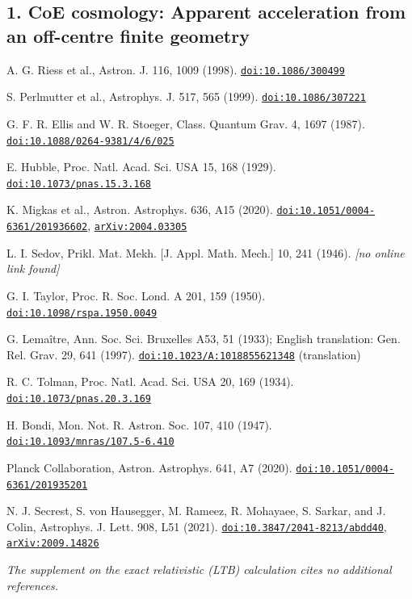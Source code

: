 \documentclass[11pt,a4paper]{article}
\begin{document}
\subsection*{1. CoE cosmology: Apparent acceleration from an off-centre finite geometry}
\begin{description}[leftmargin=2.6em,labelwidth=2.2em,labelsep=0.4em,itemsep=1pt,parsep=0pt,font=\normalfont]
\item[{[1]}] A. G. Riess et al., Astron. J. 116, 1009 (1998). \href{https://doi.org/10.1086/300499}{\nolinkurl{doi:10.1086/300499}}
\item[{[2]}] S. Perlmutter et al., Astrophys. J. 517, 565 (1999). \href{https://doi.org/10.1086/307221}{\nolinkurl{doi:10.1086/307221}}
\item[{[3]}] G. F. R. Ellis and W. R. Stoeger, Class. Quantum Grav. 4, 1697 (1987). \href{https://doi.org/10.1088/0264-9381/4/6/025}{\nolinkurl{doi:10.1088/0264-9381/4/6/025}}
\item[{[4]}] E. Hubble, Proc. Natl. Acad. Sci. USA 15, 168 (1929). \href{https://doi.org/10.1073/pnas.15.3.168}{\nolinkurl{doi:10.1073/pnas.15.3.168}}
\item[{[5]}] K. Migkas et al., Astron. Astrophys. 636, A15 (2020). \href{https://doi.org/10.1051/0004-6361/201936602}{\nolinkurl{doi:10.1051/0004-6361/201936602}}, \href{https://arxiv.org/abs/2004.03305}{\nolinkurl{arXiv:2004.03305}}
\item[{[6]}] L. I. Sedov, Prikl. Mat. Mekh. [J. Appl. Math. Mech.] 10, 241 (1946). \textit{[no online link found]}
\item[{[7]}] G. I. Taylor, Proc. R. Soc. Lond. A 201, 159 (1950). \href{https://doi.org/10.1098/rspa.1950.0049}{\nolinkurl{doi:10.1098/rspa.1950.0049}}
\item[{[8]}] G. Lemaître, Ann. Soc. Sci. Bruxelles A53, 51 (1933); English translation: Gen. Rel. Grav. 29, 641 (1997). \href{https://doi.org/10.1023/A:1018855621348}{\nolinkurl{doi:10.1023/A:1018855621348}} (translation)
\item[{[9]}] R. C. Tolman, Proc. Natl. Acad. Sci. USA 20, 169 (1934). \href{https://doi.org/10.1073/pnas.20.3.169}{\nolinkurl{doi:10.1073/pnas.20.3.169}}
\item[{[10]}] H. Bondi, Mon. Not. R. Astron. Soc. 107, 410 (1947). \href{https://doi.org/10.1093/mnras/107.5-6.410}{\nolinkurl{doi:10.1093/mnras/107.5-6.410}}
\item[{[11]}] Planck Collaboration, Astron. Astrophys. 641, A7 (2020). \href{https://doi.org/10.1051/0004-6361/201935201}{\nolinkurl{doi:10.1051/0004-6361/201935201}}
\item[{[12]}] N. J. Secrest, S. von Hausegger, M. Rameez, R. Mohayaee, S. Sarkar, and J. Colin, Astrophys. J. Lett. 908, L51 (2021). \href{https://doi.org/10.3847/2041-8213/abdd40}{\nolinkurl{doi:10.3847/2041-8213/abdd40}}, \href{https://arxiv.org/abs/2009.14826}{\nolinkurl{arXiv:2009.14826}}
\end{description}
\noindent\textit{The supplement on the exact relativistic (LTB) calculation cites no additional references.}
\end{document}
